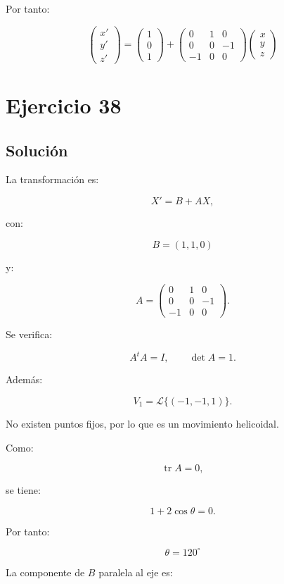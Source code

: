 \documentclass[11pt,a4paper]{article}
\newcommand{\tr}{\operatorname{tr}}
\begin{document}
Por tanto:

\[
\boxed{
\begin{pmatrix}
x'\\
y'\\
z'
\end{pmatrix}
=
\begin{pmatrix}
1\\
0\\
1
\end{pmatrix}
+
\begin{pmatrix}
0&1&0\\
0&0&-1\\
-1&0&0
\end{pmatrix}
\begin{pmatrix}
x\\
y\\
z
\end{pmatrix}
}
\]

\section{Ejercicio 38}
\subsection{Solución}

La transformación es:

\[
X'=B+AX,
\]

con:

\[
B=(1,1,0)
\]

y:

\[
A=
\begin{pmatrix}
0&1&0\\
0&0&-1\\
-1&0&0
\end{pmatrix}.
\]

Se verifica:

\[
A^tA=I,
\qquad
\det A=1.
\]

Además:

\[
V_1
=
\mathcal L\{(-1,-1,1)\}.
\]

No existen puntos fijos, por lo que es un movimiento helicoidal.

Como:

\[
\tr A=0,
\]

se tiene:

\[
1+2\cos\theta=0.
\]

Por tanto:

\[
\boxed{
\theta=120^\circ
}
\]

La componente de \(B\) paralela al eje es:
\end{document}
